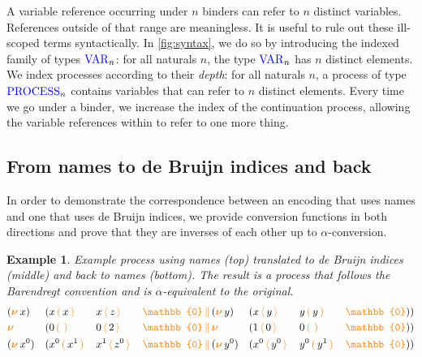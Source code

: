 \documentclass[sigplan,10pt,anonymous,review]{acmart}
\newtheorem{example}{Example}
\theoremstyle{definition}
\newcommand{\type}[1]{\textcolor{blue}{\operatorname{#1}}}
\newcommand{\constr}[1]{\textcolor{orange}{\operatorname{#1}}}
\newcommand{\PO}{\constr{\mathbb{0}}}
\newcommand{\comp}[2]{#1 \, \constr{\parallel} \, #2}
\newcommand{\new}{\constr{\boldsymbol{\nu}} \,}
\newcommand{\send}[2]{#1 \, \constr{\langle} \, #2 \,\constr{\rangle} \,}
\newcommand{\recv}[2]{#1 \, \constr{\mathbb{(}} \, #2 \, \constr{\mathbb{)}} \,}
\newcommand{\Var}{\type{VAR}}
\newcommand{\Process}{\type{PROCESS}}
\begin{document}
A variable reference occurring under $n$ binders can refer to $n$ distinct variables.
References outside of that range are meaningless.
It is useful to rule out these ill-scoped terms syntactically.
In \autoref{fig:syntax}, we do so by introducing the indexed family of types \cite{Dybjer1994} $\Var_n$: for all naturals $n$, the type $\Var_n$ has $n$ distinct elements.
We index processes according to their \emph{depth}: for all naturals $n$, a process of type $\Process_n$ contains variables that can refer to $n$ distinct elements.
Every time we go under a binder, we increase the index of the continuation process, allowing the variable references within to refer to one more thing.

\subsection{From names to de Bruijn indices and back}

In order to demonstrate the correspondence between an encoding that uses names and one that uses de Bruijn indices, we provide conversion functions in both directions and prove that they are inverses of each other up to $\alpha$-conversion.

\begin{example}
  Example process using names (top) translated to de Bruijn indices (middle) and back to names (bottom). The result is a process that follows the Barendregt convention and is $\alpha$-equivalent to the original.
  \small
  \begin{equation*}
    \begin{aligned}
      & (\new{x} ) && (\comp {\recv{x}{x} && \send{x}{z} && \PO} {(\new{y}) && (\send{x}{y} && \recv{y}{y} && \PO)}) \\
      & \new{} && (\comp {\recv{0}{} && \send{0}{2} && \PO} {\new{} && (\send{1}{0} && \recv{0}{} && \PO)}) \\
      & (\new{x^0} ) && (\comp {\recv{x^0}{x^1} && \send{x^1}{z^0} && \PO} {(\new{y^0}) && (\send{x^0}{y^0} && \recv{y^0}{y^1} && \PO)}) \\
    \end{aligned}
  \end{equation*}
\end{example}
\end{document}
